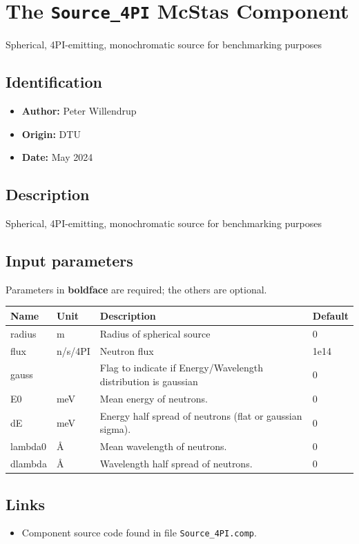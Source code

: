 \section{The \texttt{Source\_4PI} McStas Component}
Spherical, 4PI-emitting, monochromatic source for benchmarking purposes

\subsection*{Identification}
\begin{itemize}
  \item \textbf{Author:} Peter Willendrup
  \item \textbf{Origin:} DTU
  \item \textbf{Date:} May 2024
\end{itemize}

\subsection*{Description}
Spherical, 4PI-emitting, monochromatic source for benchmarking purposes

\subsection*{Input parameters}
Parameters in \textbf{boldface} are required; the others are optional.

\begin{longtable}{p{}p{}p{}p{}}
\toprule
\textbf{Name} & \textbf{Unit} & \textbf{Description} & \textbf{Default} \\
\midrule
\endhead
radius & m & Radius of spherical source & 0 \\
flux & n/s/4PI & Neutron flux & 1e14 \\
gauss &   & Flag to indicate if Energy/Wavelength distribution is gaussian & 0 \\
E0 & meV & Mean energy of neutrons. & 0 \\
dE & meV & Energy half spread of neutrons (flat or gaussian sigma). & 0 \\
lambda0 & \AA{} & Mean wavelength of neutrons. & 0 \\
dlambda & \AA{} & Wavelength half spread of neutrons. & 0 \\
\bottomrule
\end{longtable}

\subsection*{Links}
\begin{itemize}
  \item Component source code found in file \texttt{Source\_4PI.comp}.
\end{itemize}
